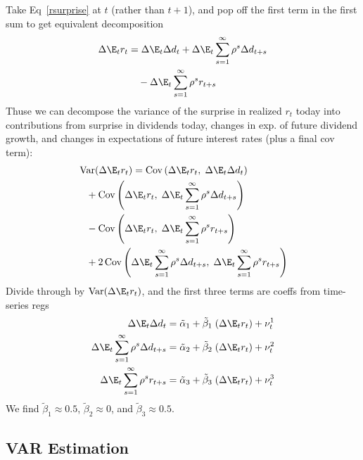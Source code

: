 \documentclass[12pt]{article}
\theoremstyle{plain}
\theoremstyle{definition}
\theoremstyle{remark}
\newcommand{\Cov}{\operatorname{Cov}}
\newcommand{\Var}{\operatorname{Var}}
\begin{document}
\begin{multicols*}{2}
Take Eq~\ref{rsurprise} at $t$ (rather than $t+1$), and pop off the
first term in the first sum to get equivalent decomposition
\begin{align*}
  \Delta\E_{t}r_{t}
  &=
  \Delta\E_t\Delta d_t
  + \Delta \E_{t} \sum_{s=1}^\infty \rho^{s}\Delta d_{t+s}
  \notag
  \\
  &\quad
  -\Delta \E_t \sum_{s=1}^\infty \rho^{s}r_{t+s}
\end{align*}
Thuse we can decompose the variance of the surprise in realized $r_t$
today into contributions from surprise in dividends today, changes in
exp.  of future dividend  growth, and changes in expectations of future
interest rates (plus a final cov term):
\begin{align}
  &\Var(\Delta\E_tr_t)
  =
  \Cov\left(
    \Delta \E_{t}r_{t},\;
    \Delta \E_{t}\Delta d_{t}
  \right)
  \label{decompsurprise}
  \\
  &\;\;\;
  +\Cov\left(
    \Delta \E_{t}r_{t},\;
    \Delta \E_{t}
    \sum_{s=1}^\infty
    \rho^{s}\Delta d_{t+s}
  \right)
  \notag
  \\
  &\;\;\;
  -\Cov\left(
    \Delta \E_{t}r_{t},\;
    \Delta \E_{t}
    \sum_{s=1}^\infty
    \rho^{s}r_{t+s}
  \right)
  \notag
  \\
  &\;\;\;
  +2\Cov\left(
    \Delta \E_{t}
    \sum_{s=1}^\infty
    \rho^{s}\Delta d_{t+s}
    ,\;
    \Delta \E_{t}
    \sum_{s=1}^\infty
    \rho^{s}r_{t+s}
  \right)
  \notag
\end{align}
Divide through by $\Var(\Delta \E_tr_t)$, and the first three terms are
coeffs from time-series regs
\begin{align*}
  \Delta \E_{t}\Delta d_{t}
  &=
    \tilde{\alpha}_{1}
    + \tilde{\beta}_{1} \; (\Delta \E_{t}r_{t})
    + \nu_t^{1} \\
  \Delta \E_{t}
  \sum_{s=1}^\infty
  \rho^{s}\Delta d_{t+s}
  &=
    \tilde{\alpha}_{2}
    + \tilde{\beta}_{2} \; (\Delta \E_{t}r_{t})
    + \nu_t^{2} \\
  \Delta \E_{t}
  \sum_{s=1}^\infty
  \rho^{s}r_{t+s}
  &=
    \tilde{\alpha}_{3}
    + \tilde{\beta}_{3} \; (\Delta \E_{t}r_{t})
    + \nu_t^{3}
\end{align*}
We find $\tilde{\beta}_1\approx 0.5$, $\tilde{\beta}_2\approx 0$, and
$\tilde{\beta}_3\approx 0.5$.


\columnbreak
\subsection{VAR Estimation}


\end{multicols*}
\end{document}
